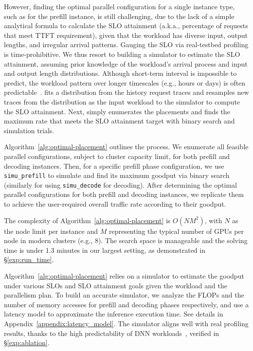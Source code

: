 However, finding the optimal parallel configuration for a single instance type, such as for the prefill instance, is still challenging, due to the lack of a simple analytical formula to calculate the SLO attainment (a.k.a., percentage of requests that meet TTFT requirement), given that the workload has diverse input, output lengths, and irregular arrival patterns. Gauging the SLO via real-testbed profiling is time-prohibitive. We thus resort to building a simulator to estimate the SLO attainment, assuming prior knowledge of the workload's arrival process and input and output length distributions.
Although short-term interval is impossible to predict, the workload pattern over longer timescales (e.g.,
hours or days) is often predictable~\cite{li2023alpaserve, zhangshepherd}. \sys fits a distribution from the history request traces and resamples new traces from the distribution as the input workload to the simulator to compute the SLO attainment. Next, \sys simply enumerates the placements and finds the maximum rate that meets the SLO attainment target with binary search and simulation trials.


Algorithm~\ref{alg:optimal-placement} outlines the process. We enumerate all feasible parallel configurations, subject to cluster capacity limit, for both prefill and decoding instances. Then, for a specific prefill phase configuration, we use \verb|simu_prefill| to simulate and find its maximum goodput via binary search (similarly for using \verb|simu_decode|  for decoding). 
After determining the optimal parallel configurations for both prefill and decoding instances, we replicate them to achieve the user-required overall traffic rate according to their goodput. 

The complexity of Algorithm~\ref{alg:optimal-placement} is $O(NM^2)$, with $N$ as the node limit per instance and $M$ representing the typical number of GPUs per node in modern clusters (e.g., 8). The search space is manageable and the solving time is under 1.3 minutes in our largest setting, as demonstrated in \S\ref{exp:run_time}.

 Algorithm~\ref{alg:optimal-placement} relies on a simulator to estimate the goodput under various SLOs and SLO attainment goals given the workload and the parallelism plan. 
To build an accurate simulator, we analyze the FLOPs and the number of memory accesses for prefill and decoding phases respectively, and use a latency model to approximate the inference execution time. See details in Appendix~\ref{appendix:latency_model}. The simulator aligns well with real profiling results, thanks to the high predictability of DNN workloads~\cite{clockwork, li2023alpaserve}, verified in \S\ref{exp:ablation}. 

